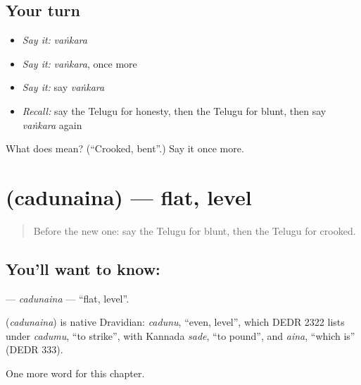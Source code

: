\subsection*{Your turn}
\begin{itemize}
\raggedright
  \item \emph{Say it:} \emph{vaṅkara}
  \item \emph{Say it:} \emph{vaṅkara}, once more
  \item \emph{Say it:} say \emph{vaṅkara}
  \item \emph{Recall:} say the Telugu for honesty, then the Telugu for blunt, then say \emph{vaṅkara} again
\end{itemize}

\begin{tcolorbox}[breakable,colback=teal!4,colframe=teal!35!black,title={Before you move on}]
What does  mean? (\textquotedblleft{}Crooked, bent\textquotedblright{}.) Say it once more.
\end{tcolorbox}
\section[\texorpdfstring{\te{చదునైన} (cadunaina)}{చదునైన (cadunaina)}]{ (cadunaina) — flat, level}

\label{lesson:TE-C298-cadunaina}



\begin{quote}
Before the new one: say the Telugu for blunt, then the Telugu for crooked.
\end{quote}

\subsection*{You'll want to know: }
\textbf{} — \emph{cadunaina} — \textquotedblleft{}flat, level\textquotedblright{}.

\begin{cousinweb}
\textbf{} (\emph{cadunaina}) is native Dravidian: \emph{cadunu}, \textquotedblleft{}even, level\textquotedblright{}, which DEDR 2322 lists under \emph{cadumu}, \textquotedblleft{}to strike\textquotedblright{}, with Kannada \emph{sade}, \textquotedblleft{}to pound\textquotedblright{}, and \emph{aina}, \textquotedblleft{}which is\textquotedblright{} (DEDR 333).
\end{cousinweb}

\begin{grammarlens}[title={What you've built}]
One more word for this chapter.
\end{grammarlens}

